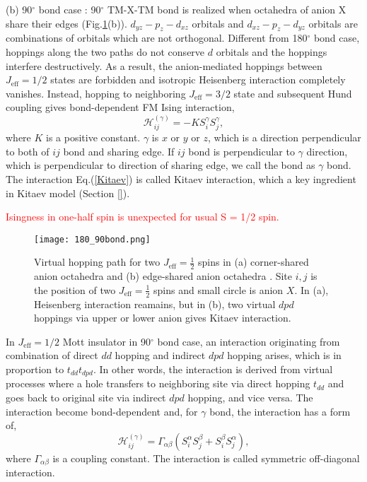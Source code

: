 (b) 90$^\circ$ bond case : 90$^\circ$ TM-X-TM bond is realized when octahedra of anion X share their edges (Fig.\ref{180_90bond}(b)).
$d_{yz}-p_z-d_{xz}$ orbitals and $d_{xz}-p_z-d_{yz}$ orbitals are combinations of orbitals which are not orthogonal.
Different from 180$^\circ$ bond case, hoppings along the two paths do not conserve $d$ orbitals and the hoppings interfere destructively.
As a result, the anion-mediated hoppings between $J_{\mathrm{eff}} = 1/2$ states are forbidden and isotropic Heisenberg interaction completely vanishes.
Instead, hopping to neighboring $J_{\mathrm{eff}} = 3/2$ state and subsequent Hund coupling gives bond-dependent FM Ising interaction,
\begin{equation}
\mathcal{H}^{(\gamma)}_{ij} = -KS^\gamma_iS^\gamma_j,
\label{Kitaev}
\end{equation}
where $K$ is a positive constant.
$\gamma$ is $x$ or $y$ or $z$, which is a direction perpendicular to both of $ij$ bond and sharing edge.
If $ij$ bond is perpendicular to $\gamma$ direction, which is perpendicular to direction of sharing edge, we call the bond as $\gamma$ bond.
The interaction Eq.(\ref{Kitaev}) is called Kitaev interaction, which a key ingredient in Kitaev model (Section \ref{}).

\textcolor{red}{Isingness in one-half spin is unexpected for usual S = 1/2 spin.}

\begin{figure}
  \centering
  \texttt{[image: 180\_90bond.png]}
  \caption{Virtual hopping path for two $J_{\mathrm{eff}} = \frac{1}{2}$ spins in (a) corner-shared anion octahedra and (b) edge-shared anion octahedra \cite{jackeli2009mott}.
  Site $i, j$ is the position of two $J_{\mathrm{eff}} = \frac{1}{2}$ spins and small circle is anion $X$.
  In (a), Heisenberg interaction reamains, but in (b), two virtual $dpd$ hoppings via upper or lower anion gives Kitaev interaction.}
  \label{180_90bond}
\end{figure}

In $J_\mathrm{eff} = 1/2$ Mott insulator in 90$^\circ$ bond case, an interaction originating from combination of direct $dd$ hopping and indirect $dpd$ hopping arises, which is in proportion to $t_{dd}t_{dpd}$.
In other words, the interaction is derived from virtual processes where a hole transfers to neighboring site via direct hopping $t_{dd}$ and goes back to original site via indirect $dpd$ hopping, and vice versa.
The interaction become bond-dependent and, for $\gamma$ bond, the interaction has a form of,
\begin{equation}
\mathcal{H}^{(\gamma)}_{ij} = \Gamma_{\alpha\beta}(S^\alpha_iS^\beta_j + S^\beta_iS^\alpha_j),
\label{symoff}
\end{equation}
where $\Gamma_{\alpha\beta}$ is a coupling constant.
The interaction is called symmetric off-diagonal interaction.

